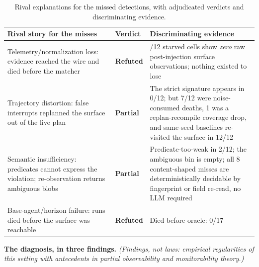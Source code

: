 \documentclass[acmsmall,screen,review,anonymous]{acmart}
\begin{document}
\begin{table}[t]
\caption{Rival explanations for the missed detections, with adjudicated verdicts and discriminating evidence.}
\label{tab:rivals}
\small
\begin{tabularx}{\columnwidth}{@{}>{\raggedright\arraybackslash}p{} l >{\raggedright\arraybackslash}X@{}}
\toprule
\textbf{Rival story for the misses} & \textbf{Verdict} & \textbf{Discriminating evidence} \\
\midrule
Telemetry/normalization loss: evidence reached the wire and died before the matcher & \textbf{Refuted} & 9/12 starved cells show \emph{zero} raw post-injection surface observations; nothing existed to lose \\
Trajectory distortion: false interrupts replanned the surface out of the live plan & \textbf{Partial} & The strict signature appears in 0/12; but 7/12 were noise-consumed deaths, 1 was a replan-recompile coverage drop, and same-seed baselines re-visited the surface in 12/12 \\
Semantic insufficiency: predicates cannot express the violation; re-observation returns ambiguous blobs & \textbf{Partial} & Predicate-too-weak in 2/12; the ambiguous bin is empty; all 8 content-shaped misses are deterministically decidable by fingerprint or field re-read, no LLM required \\
Base-agent/horizon failure: runs died before the surface was reachable & \textbf{Refuted} & Died-before-oracle: 0/17 \\
\bottomrule
\end{tabularx}
\end{table}
\textbf{The diagnosis, in three findings.} \emph{(Findings, not laws: empirical regularities of this setting with antecedents in partial observability and monitorability theory.)}
\end{document}
